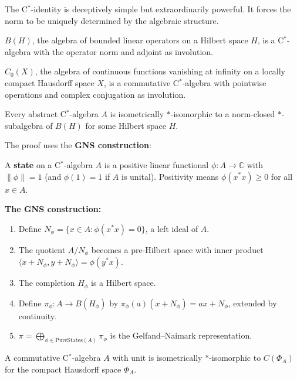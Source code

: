 The C$^*$-identity is deceptively simple but extraordinarily powerful. It forces the norm to be uniquely determined by the algebraic structure.

\begin{example}
$B(H)$, the algebra of bounded linear operators on a Hilbert space $H$, is a C$^*$-algebra with the operator norm and adjoint as involution.
\end{example}

\begin{example}
$C_0(X)$, the algebra of continuous functions vanishing at infinity on a locally compact Hausdorff space $X$, is a commutative C$^*$-algebra with pointwise operations and complex conjugation as involution.
\end{example}

\begin{theorem}
Every abstract C$^*$-algebra $A$ is isometrically $*$-isomorphic to a norm-closed $*$-subalgebra of $B(H)$ for some Hilbert space $H$.
\end{theorem}

The proof uses the \textbf{GNS construction}:

\begin{definition}[State]
A \textbf{state} on a C$^*$-algebra $A$ is a positive linear functional $\phi: A \to \mathbb{C}$ with $\|\phi\| = 1$ (and $\phi(1) = 1$ if $A$ is unital). Positivity means $\phi(x^* x) \geq 0$ for all $x \in A$.
\end{definition}

\textbf{The GNS construction:}
\begin{enumerate}
    \item Define $N_\phi = \{x \in A : \phi(x^* x) = 0\}$, a left ideal of $A$.
    \item The quotient $A/N_\phi$ becomes a pre-Hilbert space with inner product $\langle x + N_\phi, y + N_\phi \rangle = \phi(y^* x)$.
    \item The completion $H_\phi$ is a Hilbert space.
    \item Define $\pi_\phi: A \to B(H_\phi)$ by $\pi_\phi(a)(x + N_\phi) = ax + N_\phi$, extended by continuity.
    \item $\pi = \bigoplus_{\phi \in \text{PureStates}(A)} \pi_\phi$ is the Gelfand--Naimark representation.
\end{enumerate}

\begin{theorem}
A commutative C$^*$-algebra $A$ with unit is isometrically $*$-isomorphic to $C(\Phi_A)$ for the compact Hausdorff space $\Phi_A$.
\end{theorem}

